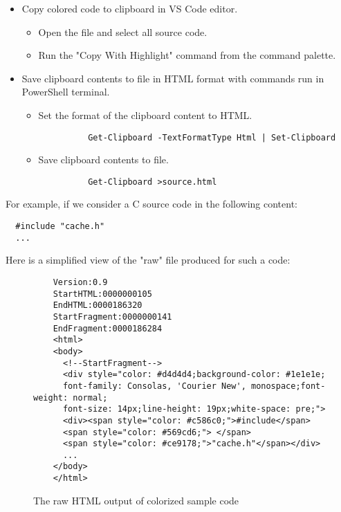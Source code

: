 \documentclass{article}
\begin{document}
\begin{itemize}
  \item Copy colored code to clipboard in VS Code editor.
    \begin{itemize}
      \item Open the file and select all source code.
      \item Run the "Copy With Highlight" command from the command palette.
    \end{itemize}
  \item Save clipboard contents to file in HTML format with commands run in PowerShell terminal.
    \begin{itemize}
      \item Set the format of the clipboard content to HTML.
        \begin{verbatim}
          Get-Clipboard -TextFormatType Html | Set-Clipboard
        \end{verbatim}
      \item Save clipboard contents to file.
        \begin{verbatim}
          Get-Clipboard >source.html
        \end{verbatim}
    \end{itemize}
\end{itemize}

For example, if we consider a C source code in the following content:

\vspace{0.1in}
\begin{BVerbatim}
  #include "cache.h"
  ...
\end{BVerbatim}
\vspace{0.1in}

Here is a simplified view of the "raw" file produced for such a code:

\begin{figure}[H]
  \centering
  \begin{BVerbatim}
    Version:0.9
    StartHTML:0000000105
    EndHTML:0000186320
    StartFragment:0000000141
    EndFragment:0000186284
    <html>
    <body>
      <!--StartFragment-->
      <div style="color: #d4d4d4;background-color: #1e1e1e;
      font-family: Consolas, 'Courier New', monospace;font-weight: normal;
      font-size: 14px;line-height: 19px;white-space: pre;">
      <div><span style="color: #c586c0;">#include</span>
      <span style="color: #569cd6;"> </span>
      <span style="color: #ce9178;">"cache.h"</span></div>
      ...
    </body>
    </html>
  \end{BVerbatim}
  \caption{The raw HTML output of colorized sample code}
  \label{code:syntaxhtml}
\end{figure}
\end{document}
